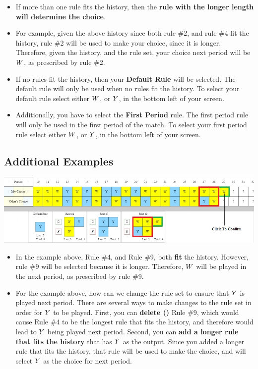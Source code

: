 \documentclass[11pt]{article}
\newcommand{\dblbkt}[1]{}
\begin{document}
\begin{itemize}
\item If more than one rule fits the history, then the {\bf rule with the longer length will determine the choice}.  
\item For example, given the above history since both \dblbkt{1}rule \#2, and \dblbkt{1}rule \#4 fit the history, \dblbkt{1}rule \#2 will be used to make your choice, since it is longer.  Therefore, given the history, and the rule set, your choice next period will \dblbkt{1}be $W$, as prescribed by \dblbkt{1}rule \#2. \dblbkt{1} \dblbkt{slnc 2000}
\item If no rules fit the history, then your \dblbkt{1}{\bf Default Rule} will be selected.  The default rule will only be used when no rules fit the history. \dblbkt{1}To select your default rule select either \dblbkt{1}$W$, or \dblbkt{1}$Y$, in the bottom left of your screen.

\item Additionally, you have to select the \dblbkt{1}{\bf First Period} rule. The first period rule will only be used in the first period of the match. To select your first period rule select either  \dblbkt{1}$W$, or \dblbkt{1}$Y$, in the bottom left of your screen.  
\end{itemize} 

\subsection*{\dblbkt{1}Additional Examples}

 
 \hspace{-.5in}
  \includegraphics[width=7in]{pictures/q3sApr2016.jpg} 
\begin{itemize}
\item In the example above, \dblbkt{1}Rule \#4, and \dblbkt{1}Rule \#9, both {\bf fit} the history. However, rule \#9 will be selected because it is longer. Therefore, \dblbkt{1}$W$ will be played in the next period, \dblbkt{1}as prescribed by rule \#9. 
\item For the example above, how can we change the rule set to ensure that $Y$ is played next period. There are several ways to make changes to the rule set in order for $Y$ to be played. First, you can {\bf delete ()} \dblbkt{1}Rule \#9, which would cause \dblbkt{1}Rule \#4 to be the longest rule that fits the history, \dblbkt{1}and therefore would lead to $Y$ being played next period. \dblbkt{slnc 5000} \dblbkt{1}Second, you \dblbkt{1}can {\bf add a longer rule that fits the history} that has $Y$ as the output. Since you added a longer rule that fits the history, that rule will be used to make the choice, and will select $Y$ as the choice for next period.\dblbkt{slnc 5000} 
\end{itemize}
\end{document}
